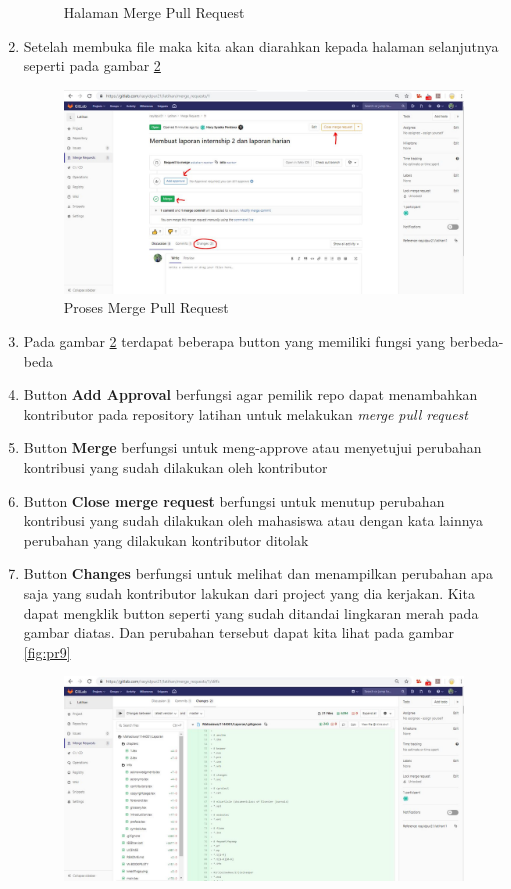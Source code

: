 \begin{enumerate}
\begin{figure}[!htbp]
\caption{Halaman Merge Pull Request}
\label{fig:pr7}
\end{figure}
\item Setelah membuka file maka kita akan diarahkan kepada halaman selanjutnya seperti pada gambar \ref{fig:pr8}
\subitem
\begin{figure}[!htbp]
\centerline{\includegraphics[width=.75\textwidth]{Figures/gitlab/pr8.JPG}}
\caption{Proses Merge Pull Request}
\label{fig:pr8}
\end{figure}
\item Pada gambar \ref{fig:pr8} terdapat beberapa button yang memiliki fungsi yang berbeda-beda
\item Button \textbf{Add Approval} berfungsi agar pemilik repo dapat menambahkan kontributor pada repository latihan untuk melakukan \textit{merge pull request}
\item Button \textbf{Merge} berfungsi untuk meng-approve atau menyetujui perubahan kontribusi yang sudah dilakukan oleh kontributor
\item Button \textbf{Close merge request} berfungsi untuk menutup perubahan kontribusi yang sudah dilakukan oleh mahasiswa atau dengan kata lainnya perubahan yang dilakukan kontributor ditolak
\item Button \textbf{Changes} berfungsi untuk melihat dan menampilkan perubahan apa saja yang sudah kontributor lakukan dari project yang dia kerjakan. Kita dapat mengklik button seperti yang sudah ditandai lingkaran merah pada gambar diatas. Dan perubahan tersebut dapat kita lihat pada gambar \ref{fig:pr9}
\subitem 
\begin{figure}[!htbp]
\centerline{\includegraphics[width=.75\textwidth]{Figures/gitlab/pr9.JPG}}

\end{figure}
\end{enumerate}
